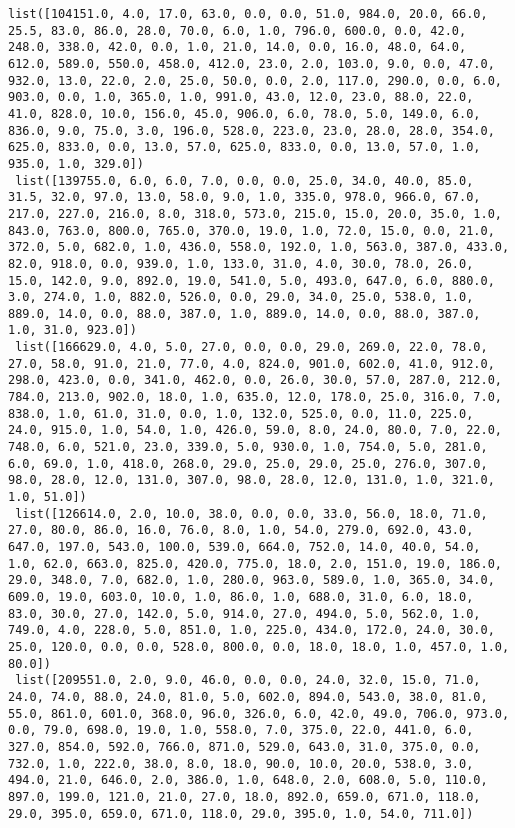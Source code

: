 \documentclass[11pt]{article}
\begin{document}
\begin{Verbatim}[commandchars=\\\{\}]
 list([104151.0, 4.0, 17.0, 63.0, 0.0, 0.0, 51.0, 984.0, 20.0, 66.0, 25.5, 83.0, 86.0, 28.0, 70.0, 6.0, 1.0, 796.0, 600.0, 0.0, 42.0, 248.0, 338.0, 42.0, 0.0, 1.0, 21.0, 14.0, 0.0, 16.0, 48.0, 64.0, 612.0, 589.0, 550.0, 458.0, 412.0, 23.0, 2.0, 103.0, 9.0, 0.0, 47.0, 932.0, 13.0, 22.0, 2.0, 25.0, 50.0, 0.0, 2.0, 117.0, 290.0, 0.0, 6.0, 903.0, 0.0, 1.0, 365.0, 1.0, 991.0, 43.0, 12.0, 23.0, 88.0, 22.0, 41.0, 828.0, 10.0, 156.0, 45.0, 906.0, 6.0, 78.0, 5.0, 149.0, 6.0, 836.0, 9.0, 75.0, 3.0, 196.0, 528.0, 223.0, 23.0, 28.0, 28.0, 354.0, 625.0, 833.0, 0.0, 13.0, 57.0, 625.0, 833.0, 0.0, 13.0, 57.0, 1.0, 935.0, 1.0, 329.0])
 list([139755.0, 6.0, 6.0, 7.0, 0.0, 0.0, 25.0, 34.0, 40.0, 85.0, 31.5, 32.0, 97.0, 13.0, 58.0, 9.0, 1.0, 335.0, 978.0, 966.0, 67.0, 217.0, 227.0, 216.0, 8.0, 318.0, 573.0, 215.0, 15.0, 20.0, 35.0, 1.0, 843.0, 763.0, 800.0, 765.0, 370.0, 19.0, 1.0, 72.0, 15.0, 0.0, 21.0, 372.0, 5.0, 682.0, 1.0, 436.0, 558.0, 192.0, 1.0, 563.0, 387.0, 433.0, 82.0, 918.0, 0.0, 939.0, 1.0, 133.0, 31.0, 4.0, 30.0, 78.0, 26.0, 15.0, 142.0, 9.0, 892.0, 19.0, 541.0, 5.0, 493.0, 647.0, 6.0, 880.0, 3.0, 274.0, 1.0, 882.0, 526.0, 0.0, 29.0, 34.0, 25.0, 538.0, 1.0, 889.0, 14.0, 0.0, 88.0, 387.0, 1.0, 889.0, 14.0, 0.0, 88.0, 387.0, 1.0, 31.0, 923.0])
 list([166629.0, 4.0, 5.0, 27.0, 0.0, 0.0, 29.0, 269.0, 22.0, 78.0, 27.0, 58.0, 91.0, 21.0, 77.0, 4.0, 824.0, 901.0, 602.0, 41.0, 912.0, 298.0, 423.0, 0.0, 341.0, 462.0, 0.0, 26.0, 30.0, 57.0, 287.0, 212.0, 784.0, 213.0, 902.0, 18.0, 1.0, 635.0, 12.0, 178.0, 25.0, 316.0, 7.0, 838.0, 1.0, 61.0, 31.0, 0.0, 1.0, 132.0, 525.0, 0.0, 11.0, 225.0, 24.0, 915.0, 1.0, 54.0, 1.0, 426.0, 59.0, 8.0, 24.0, 80.0, 7.0, 22.0, 748.0, 6.0, 521.0, 23.0, 339.0, 5.0, 930.0, 1.0, 754.0, 5.0, 281.0, 6.0, 69.0, 1.0, 418.0, 268.0, 29.0, 25.0, 29.0, 25.0, 276.0, 307.0, 98.0, 28.0, 12.0, 131.0, 307.0, 98.0, 28.0, 12.0, 131.0, 1.0, 321.0, 1.0, 51.0])
 list([126614.0, 2.0, 10.0, 38.0, 0.0, 0.0, 33.0, 56.0, 18.0, 71.0, 27.0, 80.0, 86.0, 16.0, 76.0, 8.0, 1.0, 54.0, 279.0, 692.0, 43.0, 647.0, 197.0, 543.0, 100.0, 539.0, 664.0, 752.0, 14.0, 40.0, 54.0, 1.0, 62.0, 663.0, 825.0, 420.0, 775.0, 18.0, 2.0, 151.0, 19.0, 186.0, 29.0, 348.0, 7.0, 682.0, 1.0, 280.0, 963.0, 589.0, 1.0, 365.0, 34.0, 609.0, 19.0, 603.0, 10.0, 1.0, 86.0, 1.0, 688.0, 31.0, 6.0, 18.0, 83.0, 30.0, 27.0, 142.0, 5.0, 914.0, 27.0, 494.0, 5.0, 562.0, 1.0, 749.0, 4.0, 228.0, 5.0, 851.0, 1.0, 225.0, 434.0, 172.0, 24.0, 30.0, 25.0, 120.0, 0.0, 0.0, 528.0, 800.0, 0.0, 18.0, 18.0, 1.0, 457.0, 1.0, 80.0])
 list([209551.0, 2.0, 9.0, 46.0, 0.0, 0.0, 24.0, 32.0, 15.0, 71.0, 24.0, 74.0, 88.0, 24.0, 81.0, 5.0, 602.0, 894.0, 543.0, 38.0, 81.0, 55.0, 861.0, 601.0, 368.0, 96.0, 326.0, 6.0, 42.0, 49.0, 706.0, 973.0, 0.0, 79.0, 698.0, 19.0, 1.0, 558.0, 7.0, 375.0, 22.0, 441.0, 6.0, 327.0, 854.0, 592.0, 766.0, 871.0, 529.0, 643.0, 31.0, 375.0, 0.0, 732.0, 1.0, 222.0, 38.0, 8.0, 18.0, 90.0, 10.0, 20.0, 538.0, 3.0, 494.0, 21.0, 646.0, 2.0, 386.0, 1.0, 648.0, 2.0, 608.0, 5.0, 110.0, 897.0, 199.0, 121.0, 21.0, 27.0, 18.0, 892.0, 659.0, 671.0, 118.0, 29.0, 395.0, 659.0, 671.0, 118.0, 29.0, 395.0, 1.0, 54.0, 711.0])

\end{Verbatim}
\end{document}
